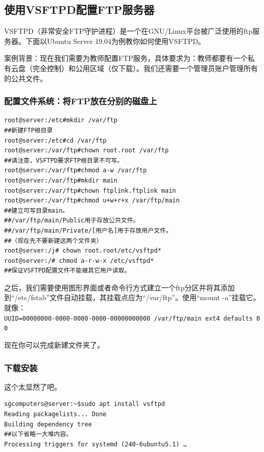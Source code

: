 \subsection{使用VSFTPD配置FTP服务器}
VSFTPD（非常安全FTP守护进程）是一个在GNU/Linux平台被广泛使用的ftp服务器。下面以Ubuntu Server 19.04为例教你如何使用VSFTPD。\par
案例背景：现在我们需要为教师配置FTP服务，具体要求为：教师都要有一个私有云盘（完全控制）和公用区域（仅下载）。我们还需要一个管理员账户管理所有的公共文件。
\subsubsection{配置文件系统：将FTP放在分别的磁盘上}
\begin{verbatim}
root@server:/etc#mkdir /var/ftp
##新建FTP根目录
root@server:/etc#cd /var/ftp
root@server:/var/ftp#chown root.root /var/ftp
##请注意，VSFTPD要求FTP根目录不可写。
root@server:/var/ftp#chmod a-w /var/ftp
root@server:/var/ftp#mkdir main
root@server:/var/ftp#chown ftplink.ftplink main
root@server:/var/ftp#chmod u+w+r+x /var/ftp/main
##建立可写目录main。
##/var/ftp/main/Public用于存放公共文件。
##/var/ftp/main/Private/[用户名]用于存放用户文件。
##（现在先不要新建这两个文件夹）
root@server:/j# chown root.root/etc/vsftpd*
root@server:/# chmod a-r-w-x /etc/vsftpd*
##保证VSFTPD配置文件不能被其它用户读取。
\end{verbatim}\par
之后，我们需要使用图形界面或者命令行方式建立一个ftp分区并将其添加到“/etc/fstab”文件自动挂载，其挂载点应为“/var/ftp”。使用“mount -a”挂载它。就像：\\
\verb|UUID=00000000-0000-0000-0000-00000000000 /var/ftp/main ext4 defaults 0 0|\par
现在你可以完成新建文件夹了。
\subsubsection{下载安装}
这个太显然了吧。
\begin{verbatim}
sgcomputers@server:~$sudo apt install vsftpd
Reading packagelists... Done
Building dependency tree
##以下省略一大堆内容。
Processing triggers for systemd (240-6ubuntu5.1) …
\end{verbatim}
